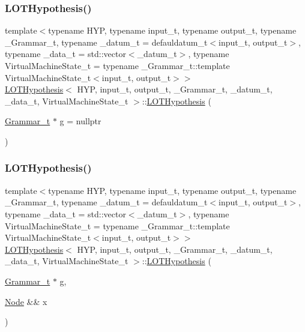 \subsubsection{\texorpdfstring{L\+O\+T\+Hypothesis()}{LOTHypothesis()}\hspace{0.1cm}{\footnotesize\ttfamily [1/4]}}
{\footnotesize\ttfamily template$<$typename H\+YP, typename input\+\_\+t, typename output\+\_\+t, typename \+\_\+\+Grammar\+\_\+t, typename \+\_\+datum\+\_\+t = defauldatum\+\_\+t$<$input\+\_\+t, output\+\_\+t$>$, typename \+\_\+data\+\_\+t = std\+::vector$<$\+\_\+datum\+\_\+t$>$, typename Virtual\+Machine\+State\+\_\+t = typename \+\_\+\+Grammar\+\_\+t\+::template Virtual\+Machine\+State\+\_\+t$<$input\+\_\+t, output\+\_\+t$>$$>$ \\
\hyperlink{class_l_o_t_hypothesis}{L\+O\+T\+Hypothesis}$<$ H\+YP, input\+\_\+t, output\+\_\+t, \+\_\+\+Grammar\+\_\+t, \+\_\+datum\+\_\+t, \+\_\+data\+\_\+t, Virtual\+Machine\+State\+\_\+t $>$\+::\hyperlink{class_l_o_t_hypothesis}{L\+O\+T\+Hypothesis} (\begin{DoxyParamCaption}\item[{\hyperlink{class_l_o_t_hypothesis_a8006204013d471860e54c49d19edbace}{Grammar\+\_\+t} $\ast$}]{g = {\ttfamily nullptr} }\end{DoxyParamCaption})\hspace{0.3cm}{\ttfamily [inline]}}

\mbox{\label{class_l_o_t_hypothesis_aa14b68e8efcb570186fe289bc4a791d5}} 
\subsubsection{\texorpdfstring{L\+O\+T\+Hypothesis()}{LOTHypothesis()}\hspace{0.1cm}{\footnotesize\ttfamily [2/4]}}
{\footnotesize\ttfamily template$<$typename H\+YP, typename input\+\_\+t, typename output\+\_\+t, typename \+\_\+\+Grammar\+\_\+t, typename \+\_\+datum\+\_\+t = defauldatum\+\_\+t$<$input\+\_\+t, output\+\_\+t$>$, typename \+\_\+data\+\_\+t = std\+::vector$<$\+\_\+datum\+\_\+t$>$, typename Virtual\+Machine\+State\+\_\+t = typename \+\_\+\+Grammar\+\_\+t\+::template Virtual\+Machine\+State\+\_\+t$<$input\+\_\+t, output\+\_\+t$>$$>$ \\
\hyperlink{class_l_o_t_hypothesis}{L\+O\+T\+Hypothesis}$<$ H\+YP, input\+\_\+t, output\+\_\+t, \+\_\+\+Grammar\+\_\+t, \+\_\+datum\+\_\+t, \+\_\+data\+\_\+t, Virtual\+Machine\+State\+\_\+t $>$\+::\hyperlink{class_l_o_t_hypothesis}{L\+O\+T\+Hypothesis} (\begin{DoxyParamCaption}\item[{\hyperlink{class_l_o_t_hypothesis_a8006204013d471860e54c49d19edbace}{Grammar\+\_\+t} $\ast$}]{g,  }\item[{\hyperlink{class_node}{Node} \&\&}]{x }\end{DoxyParamCaption})\hspace{0.3cm}{\ttfamily [inline]}}

